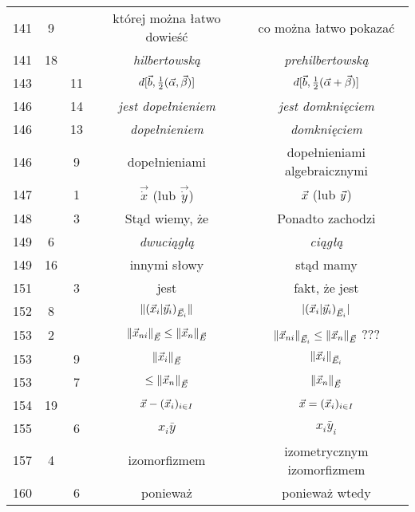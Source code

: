 \documentclass[a4paper,11pt]{article}
\numberwithin{equation}{section}
\begin{document}
\begin{center}
\begin{tabular}{|c|c|c|c|c|}
    141 &  9 & & której można łatwo dowieść & co można łatwo pokazać \\
    141 & 18 & & \textit{hilbertowską} & \textit{prehilbertowską} \\
    143 & & 11 & $d[ \vec{b}, \frac{ 1 }{ 2 } ( \vec{ \alpha }, \vec{ \beta }) ]$
           & $d[ \vec{b}, \frac{ 1 }{ 2 } ( \vec{ \alpha } + \vec{ \beta }) ]$ \\
    146 & & 14 & \textit{jest dopełnieniem} & \textit{jest domknięciem} \\
    146 & & 13 & \textit{dopełnieniem} & \textit{domknięciem} \\
    146 & &  9 & dopełnieniami & dopełnieniami algebraicznymi \\
    147 & &  1 & $\vec{ \dot{ x } }$ (lub $\vec{ \dot{ y } }$)
           & $\vec{x}$ (lub $\vec{y}$) \\
    148 & &  3 & Stąd wiemy, że & Ponadto zachodzi \\
    149 &  6 & & \textit{dwuciągłą} & \textit{ciągłą} \\
    149 & 16 & & innymi słowy & stąd mamy \\
    151 & &  3 & jest & fakt, że jest \\
    152 &  8 & & $\Vert ( \vec{x}_{ i } | \vec{y}_{ i } )_{ \vec{E}_{ i } } \Vert$
           & $| ( \vec{x}_{ i } | \vec{y}_{ i } )_{ \vec{E}_{ i } } |$ \\
    153 &  2 & & $\Vert \vec{x}_{ ni } \Vert_{ \vec{E} } \leq \Vert \vec{x}_{ n } \Vert_{ \vec{E} }$
           & $\Vert \vec{x}_{ ni } \Vert_{ \vec{E}_{ i } }
             \leq \Vert \vec{x}_{ n } \Vert_{ \vec{E} }$ ??? \\
    153 & &  9 & $\Vert \vec{x}_{ i } \Vert_{ \vec{E} }$
           & $\Vert \vec{x}_{ i } \Vert_{ \vec{E}_{ i } }$ \\
    153 & &  7 & $\leq \Vert \vec{x}_{ n } \Vert_{ \vec{E} }$
           & $\Vert \vec{x}_{ n } \Vert_{ \vec{E} }$ \\
    154 & 19 & & $\vec{x} - ( \vec{x}_{ i } )_{ i \in I }$
           & $\vec{x} = ( \vec{x}_{ i } )_{ i \in I }$ \\
    155 & &  6 & $x_{ i } \bar{ y }$ & $x_{ i } \bar{ y }_{ i }$ \\
    157 &  4 & & izomorfizmem & izometrycznym izomorfizmem \\
    160 & &  6 & ponieważ & ponieważ wtedy \\
    \hline
  \end{tabular}






\end{center}
\end{document}
